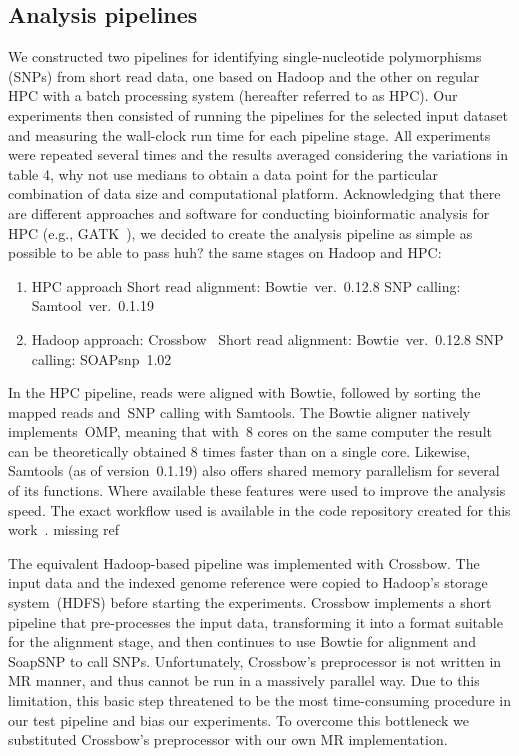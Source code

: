 \documentclass[11pt, oneside]{article}   	%
\newcommand{\COMMENT}[1]{{\color{red} #1 }}
\begin{document}
\subsection{Analysis pipelines}
We constructed two pipelines for identifying single-nucleotide polymorphisms (SNPs) from short read data, one based on Hadoop and the other on regular HPC with a batch processing system (hereafter referred to as HPC). Our experiments then consisted of running the pipelines for the selected input dataset and measuring the wall-clock run time for each pipeline stage. All experiments were repeated several times and the results averaged \COMMENT{considering the variations in table 4, why not use medians} to obtain a data point for the particular combination of data size and computational platform. Acknowledging that there are different approaches and software for conducting bioinformatic analysis for HPC (e.g., GATK~\cite{gatk}), we decided to create the  analysis pipeline as simple as possible to be able to pass \COMMENT{huh?} the same stages on Hadoop and HPC:


\begin{enumerate}
\item HPC approach
\subitem Short read alignment: Bowtie~ver.~0.12.8
\subitem SNP calling: Samtool~ver.~0.1.19
\item Hadoop approach: Crossbow~\cite{crossbow}
\subitem Short read alignment: Bowtie~ver.~0.12.8
\subitem SNP calling: SOAPsnp~1.02~\cite{soapsnp}
\end{enumerate}


In the HPC pipeline, reads were aligned with Bowtie, followed by sorting the mapped reads and~SNP calling with Samtools. The Bowtie aligner natively implements~OMP, meaning that with~8 cores on the same computer the result can be theoretically obtained 8 times faster than on a single core. Likewise, Samtools (as of version~0.1.19) also offers shared memory parallelism for several of its functions. Where available these features were used to improve the analysis speed. The exact workflow used is available in the code repository created for this work~\cite{code_repo}. \COMMENT{missing ref}

The equivalent Hadoop-based pipeline was implemented with Crossbow. The input data and the indexed genome reference were copied to Hadoop's storage system~(HDFS) before starting the experiments. Crossbow implements a short pipeline that pre-processes the input data, transforming it into a format suitable for the alignment stage, and then continues to use Bowtie for alignment and SoapSNP to call SNPs.  Unfortunately, Crossbow's preprocessor is not written in MR manner, and thus cannot be run in a massively parallel way. Due to this limitation, this basic step threatened to be the most time-consuming procedure in our test pipeline and bias our experiments. To overcome this bottleneck we substituted Crossbow's preprocessor with our own MR implementation.
\end{document}

